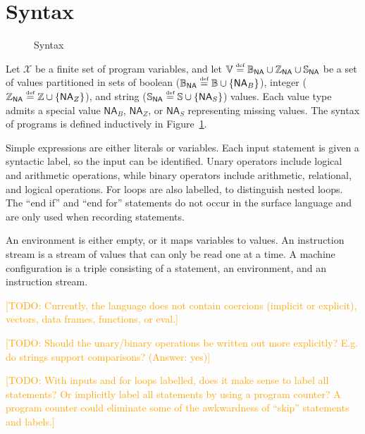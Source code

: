 \documentclass{article}
\newcommand{\defined}{\ensuremath{\stackrel{\mbox{\tiny def}}{=}}\xspace} %
\newcommand{\vars}{\ensuremath{\mathcal{X}}\xspace} %
\newcommand{\vals}{\ensuremath{\mathbb{V}}\xspace} %
\newcommand{\na}{\ensuremath{\mathsf{NA}}\xspace} %
\newcommand{\bvals}{\ensuremath{\mathbb{B}_\na}\xspace} %
\newcommand{\bools}{\ensuremath{\mathbb{B}}\xspace} %
\newcommand{\bna}{\ensuremath{\na_{B}}\xspace} %
\newcommand{\ivals}{\ensuremath{\mathbb{Z}_\na}\xspace} %
\newcommand{\ints}{\ensuremath{\mathbb{Z}}\xspace} %
\newcommand{\ina}{\ensuremath{\na_{Z}}\xspace} %
\newcommand{\svals}{\ensuremath{\mathbb{S}_\na}\xspace} %
\newcommand{\strings}{\ensuremath{\mathbb{S}}\xspace} %
\newcommand{\sna}{\ensuremath{\na_{S}}\xspace} %
\newcommand{\irem}[3]{{\noindent\textcolor{#1}{\textsf{[#2: 
#3]}}}}
\newcommand{\todo}[1]{\irem{orange}{TODO}{#1}}
\begin{document}
\section*{Syntax}

\begin{figure}[th!]
  \begin{center}
    \begin{small}
      \grammartabularSTY{%
        \ottv\ottinterrule%
        \ottse\ottinterrule%
        \otts\ottinterrule%
        \ottE\ottinterrule%
        \ottI\ottinterrule%
        \ottC\ottafterlastrule%
      }
    \end{small}
  \end{center}
  \caption{Syntax}\label{fig:syntax}
\end{figure}

Let \vars be a finite set of program variables, and let $\vals\defined\bvals \cup \ivals \cup \svals$ be a set of values partitioned  in sets of boolean ($\bvals \defined \bools \cup \{\bna\} $), integer ($\ivals \defined \ints \cup \{\ina\} $), and string ($\svals \defined \strings \cup \{\sna\} $) values. Each value type admits a special value $\bna$, $\ina$, or $\sna$ representing missing values.
The syntax of programs is defined inductively in Figure~\ref{fig:syntax}.

Simple expressions are either literals or variables. Each input statement is
given a syntactic label, so the input can be identified.
Unary operators include logical and arithmetic operations, while binary
operators include arithmetic, relational, and logical operations.
For loops are also labelled, to distinguish nested loops.
The ``end if'' and ``end for'' statements do not occur in the
surface language and are only used when recording statements.

An environment is either empty, or it maps variables to values. An instruction
stream is a stream of values that can only be read one at a time. A machine
configuration is a triple consisting of a statement, an environment, and an
instruction stream.

\todo{Currently, the language does not contain coercions (implicit or explicit),
vectors, data frames, functions, or eval.}

\todo{Should the unary/binary operations be written out more explicitly? E.g. do
strings support comparisons? (Answer: yes)}

\todo{With inputs and for loops labelled, does it make sense to label all
statements? Or implicitly label all statements by using a program counter? A
program counter could eliminate some of the awkwardness of ``skip'' statements
and labels.}
\end{document}
